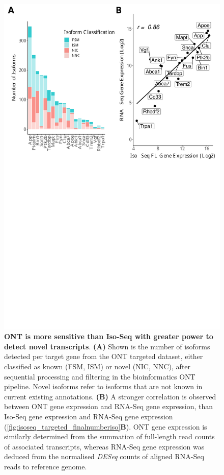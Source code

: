 \begin{figure}[!htp]
	\begin{center}
		\includegraphics[page=2,trim={0 20cm 0 0cm},clip,scale = 0.60]{Figures/ONTvsIsoSeq.pdf}
	\end{center}
	\captionsetup{width=0.95\textwidth}
	\caption[ONT is more sensitive than Iso-Seq with greater power to detect novel transcripts]%
	{\textbf{ONT is more sensitive than Iso-Seq with greater power to detect novel transcripts}. \textbf{(A)} Shown is the number of isoforms detected per target gene from the ONT targeted dataset, either classified as known (FSM, ISM) or novel (NIC, NNC), after sequential processing and filtering in the bioinformatics ONT pipeline. Novel isoforms refer to isoforms that are not known in current existing annotations. \textbf{(B)} A stronger correlation is observed between ONT gene expression and RNA-Seq gene expression, than Iso-Seq gene expression and RNA-Seq gene expression (\cref{fig:isoseq_targeted_finalnumberiso}\textbf{B}). ONT gene expression is similarly determined from the summation of full-length read counts of associated transcripts, whereas RNA-Seq gene expression was deduced from the normalised \textit{DESeq} counts of aligned RNA-Seq reads to reference genome\cite{Castanho2020}.}
	\label{fig:ont_targeted_finalnumberiso}
\end{figure}

